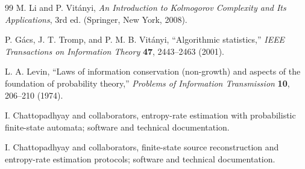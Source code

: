 \documentclass[
  aps,
  prresearch,
  reprint,
  amsmath,
  amssymb,
  superscriptaddress,
  nofootinbib,
  longbibliography
]{revtex4-2}
\begin{document}
\begin{thebibliography}{99}
M. Li and P. Vit{\'a}nyi, \emph{An Introduction to Kolmogorov Complexity and Its Applications}, 3rd ed. (Springer, New York, 2008).

P. G{\'a}cs, J. T. Tromp, and P. M. B. Vit{\'a}nyi, ``Algorithmic statistics,'' \emph{IEEE Transactions on Information Theory} \textbf{47}, 2443--2463 (2001).

L. A. Levin, ``Laws of information conservation (non-growth) and aspects of the foundation of probability theory,'' \emph{Problems of Information Transmission} \textbf{10}, 206--210 (1974).

I. Chattopadhyay and collaborators, entropy-rate estimation with probabilistic finite-state automata; software and technical documentation.

I. Chattopadhyay and collaborators, finite-state source reconstruction and entropy-rate estimation protocols; software and technical documentation.

\end{thebibliography}
\end{document}
